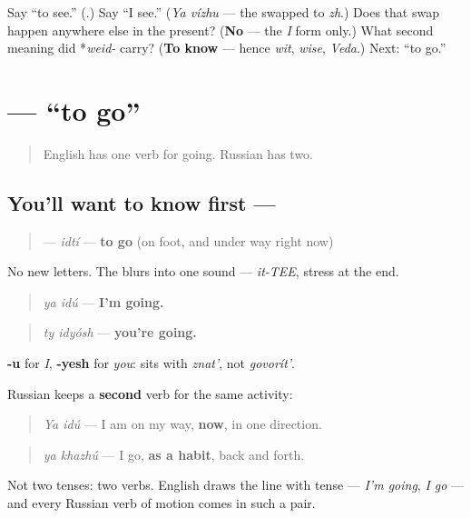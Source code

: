 \begin{tcolorbox}[breakable,colback=teal!4,colframe=teal!35!black,title={Before you move on}]
Say \textquotedblleft{}to see.\textquotedblright{} (\textbf{}.) Say \textquotedblleft{}I see.\textquotedblright{} (\emph{Ya vízhu} — the \textbf{} swapped to \emph{zh}.) Does that swap happen anywhere else in the present? (\textbf{No} — the \emph{I} form only.) What second meaning did *\emph{weid-} carry? (\textbf{To know} — hence \emph{wit}, \emph{wise}, \emph{Veda}.) Next: \textquotedblleft{}to go.\textquotedblright{}
\end{tcolorbox}
\section[\texorpdfstring{\ru{идти} (idtí)}{идти (idtí)}]{ — \textquotedblleft{}to go\textquotedblright{}}

\label{lesson:RU-C03-idti}



\begin{quote}
English has one verb for going. Russian has two.
\end{quote}

\subsection*{You'll want to know first — }
\begin{quote}
\textbf{} — \emph{idtí} — \textbf{to go} (on foot, and under way right now)
\end{quote}

No new letters. The \textbf{} blurs into one sound — \emph{it-TEE}, stress at the end.

\begin{quote}
\emph{ya idú} — \textbf{I'm going.}
\end{quote}

\begin{quote}
\emph{ty idyósh} — \textbf{you're going.}
\end{quote}

\textbf{-u} for \emph{I}, \textbf{-yesh} for \emph{you}: \emph{} sits with \emph{znat'}, not \emph{govorít'}.

\begin{grammarlens}[title={Grammar Lens: going now against going often}]
Russian keeps a \textbf{second} verb for the same activity:

\begin{quote}
\emph{Ya idú} — I am on my way, \textbf{now}, in one direction.
\end{quote}

\begin{quote}
\emph{ya khazhú} — I go, \textbf{as a habit}, back and forth.
\end{quote}

Not two tenses: two verbs. English draws the line with tense — \emph{I'm going}, \emph{I go} — and every Russian verb of motion comes in such a pair.
\end{grammarlens}

